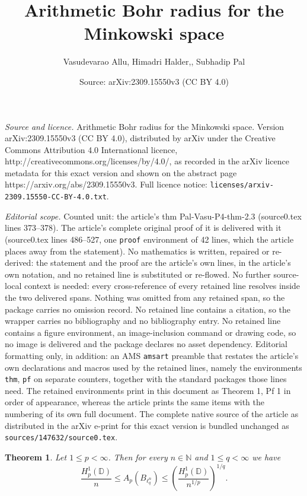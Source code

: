 \documentclass[10pt,a4paper]{amsart}
\title{Arithmetic Bohr radius for the Minkowski space}
\author{Vasudevarao Allu, Himadri Halder,, Subhadip Pal}
\date{Source: arXiv:2309.15550v3 (CC BY 4.0)}
\newtheorem{thm}{Theorem}
\begin{document}
\maketitle

\noindent\emph{Source and licence.} Arithmetic Bohr radius for the Minkowski space. Version arXiv:2309.15550v3 (CC BY 4.0), distributed by arXiv under the Creative Commons Attribution 4.0 International licence, http://creativecommons.org/licenses/by/4.0/, as recorded in the arXiv licence metadata for this exact version and shown on the abstract page https://arxiv.org/abs/2309.15550v3. Full licence notice: \texttt{licenses/arxiv-2309.15550-CC-BY-4.0.txt}.\par\smallskip

\noindent\textit{Editorial scope.} Counted unit: the article's thm Pal-Vasu-P4-thm-2.3 (source0.tex lines 373--378). The article's complete original proof of it is delivered with it (source0.tex lines 486--527, one \texttt{proof} environment of 42 lines, which the article places away from the statement). No mathematics is written, repaired or re-derived: the statement and the proof are the article's own lines, in the article's own notation, and no retained line is substituted or re-flowed.  No further source-local context is needed: every cross-reference of every retained line resolves inside the two delivered spans.  Nothing was omitted from any retained span, so the package carries no omission record.  No retained line contains a citation, so the wrapper carries no bibliography and no bibliography entry.  No retained line contains a figure environment, an image-inclusion command or drawing code, so no image is delivered and the package declares no asset dependency.  Editorial formatting only, in addition: an AMS \texttt{amsart} preamble that restates the article's own declarations and macros used by the retained lines, namely the environments \texttt{thm}, \texttt{pf} on separate counters, together with the standard packages those lines need.  The retained environments print in this document as Theorem 1, Pf 1 in order of appearance, whereas the article prints the same items with the numbering of its own full document.  The complete native source of the article as distributed in the arXiv e-print for this exact version is bundled unchanged as \texttt{sources/147632/source0.tex}.
\begin{thm}\label{Pal-Vasu-P4-thm-2.3}
Let $1\leq p<\infty$. Then for every $n\in \mathbb{N}$ and $1\leq q<\infty$ we have 
\begin{equation*}
	\frac{H^1_p(\mathbb{D})}{n}\leq A_p\left(B_{\ell^n_q}\right)\leq \left(\frac{H^1_p(\mathbb{D})}{n^{1/p}}\right)^{1/q}.
\end{equation*}
\end{thm}
\end{document}
